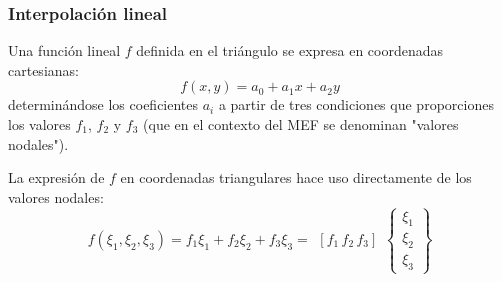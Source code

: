 \documentclass[handout]{beamer}
\begin{document}
\begin{frame}
	\frametitle{Interpolación lineal}
	Una función lineal $f$ definida en el triángulo se expresa en coordenadas
	cartesianas:
	\begin{equation}
		f(x,y)=a_0+a_1 x + a_2 y
	\end{equation}
	determinándose los coeficientes $a_i$ a partir de tres condiciones que
	proporciones los valores $f_1$, $f_2$ y $f_3$ (que en el contexto del MEF se 
	denominan "valores nodales").
	
	La expresión de $f$ en coordenadas triangulares hace uso directamente de los
	valores nodales:
	\begin{equation}
		f(\xi_1,\xi_2,\xi_3)=f_1 \xi_1+f_2 \xi_2+f_3 \xi_3=
		\begin{array}{ccc}
			\left[ f_1 \, f_2 \, f_3 \right]
		\end{array}
		\left\{ 
		\begin{array}{c}
			\xi_1 \\
			\xi_2 \\
			\xi_3 
		\end{array}
		\right\}
	\end{equation}
\end{frame}
\end{document}
